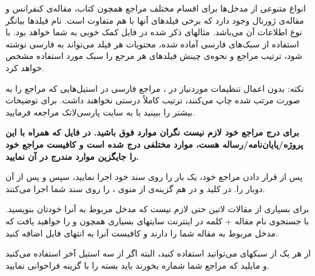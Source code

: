انواع متنوعی از مدخل‌ها برای اقسام مختلف مراجع همچون کتاب، مقاله‌ی کنفرانس و مقاله‌ی ژورنال وجود دارد که برخی فیلدهای آنها با هم متفاوت است. 
نام فیلدها بیانگر نوع اطلاعات آن می‌باشد. مثالهای ذکر شده در فایل  کمک خوبی به شما خواهد بود. 
با استفاده از سبک‌های فارسی آماده شده، محتویات هر فیلد می‌تواند به فارسی نوشته شود، ترتیب مراجع و نحوه‌ی چینش فیلدهای هر مرجع را سبک مورد استفاده  مشخص خواهد کرد.

نکته: بدون اعمال تنظیمات موردنیاز  در ، مراجع فارسی در استیل‌هایی که مراجع را به صورت مرتب شده چاپ می‌کنند، ترتیب کاملاً درستی نخواهند داشت. برای توضیحات بیشتر \cite{persianbib87userguide} را ببینید یا به سایت پارسی‌لاتک مراجعه فرمایید.

\textbf{برای درج مراجع خود لازم نیست نگران موارد فوق باشید. در فایل 
 که همراه با این پروژه/پایان‌نامه/رساله هست، موارد مختلفی درج شده است و کافیست مراجع خود را جایگزین موارد مندرج در آن نمایید.
}

پس از قرار دادن مراجع خود، یک بار  را روی سند خود اجرا نمایید، سپس  و پس از آن دوبار  را. در  کلید  و در  هم گزینه‌ی  از منوی ،  را روی سند شما اجرا می‌کنند.

برای بسیاری از مقالات لاتین حتی لازم نیست که مدخل مربوط به آنرا خودتان بنویسید. با جستجوی نام مقاله + کلمه   در اینترنت سایتهای بسیاری همچون  و  را خواهید یافت که مدخل  مربوط به مقاله شما را دارند و کافیست آنرا به انتهای فایل  اضافه کنید.

از هر یک از سبکهای  می‌توانید استفاده کنید، البته اگر از سه استیل آخر استفاده می‌کنید و مایلید که مراجع شما شماره بخورند باید بسته  را با گزینه  فراخوانی نمایید.
